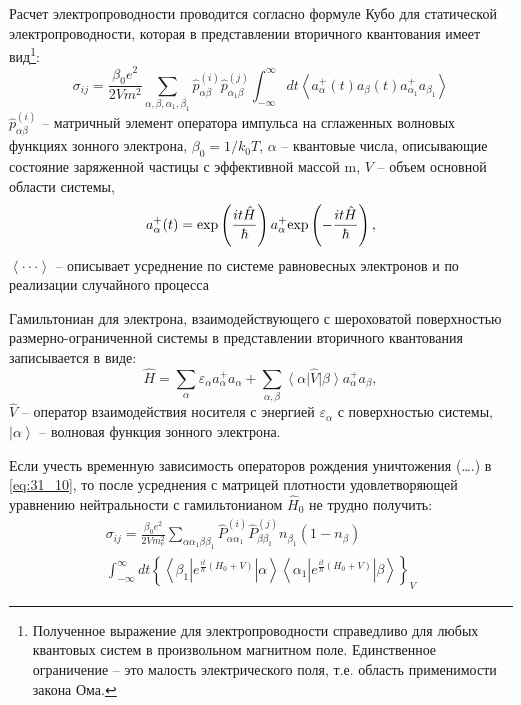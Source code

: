 Расчет электропроводности проводится согласно формуле Кубо \cite{Kubo1957a} для статической электропроводности, которая в представлении вторичного квантования имеет вид\footnote{ Полученное выражение для электропроводности справедливо для любых квантовых систем в произвольном магнитном поле. Единственное ограничение -- это малость электрического поля, т.е. область применимости закона Ома.}:
\begin{equation} \label{eq:31_10}
\sigma _{ij} =\frac{\beta _{0} e^{2} }{2Vm^{2} } \sum _{\alpha ,\beta ,\alpha _{1} ,\beta _{1} }\hat{p}_{\alpha \beta }^{(i)} \hat{p}_{\alpha _{1} \beta }^{(j)} \int _{-\infty }^{\infty }dt\left\langle a_{\alpha }^{+} (t)a_{\beta } (t)a_{\alpha _{1} }^{+} a_{\beta _{1} } \right\rangle
\end{equation} 
$\hat{p}_{\alpha \beta }^{(i)} $ -- матричный элемент оператора импульса на сглаженных волновых функциях зонного электрона, $\beta _{0} =1/k_{0} T$, $\alpha $ -- квантовые числа, описывающие состояние заряженной частицы с эффективной массой m, $V$ -- объем основной области системы,
\[
a_{\alpha }^{+} (t)={\rm exp}\left(\frac{it\hat{H}}{\hbar } \right)a_{\alpha }^{+} {\rm exp}\left(-\frac{it\hat{H}}{\hbar } \right),
\] 
$\left\langle \cdot \cdot \cdot \right\rangle $ -- описывает усреднение по системе равновесных электронов и по реализации случайного процесса

Гамильтониан для электрона, взаимодействующего с шероховатой поверхностью размерно-ограниченной системы в представлении вторичного квантования записывается в виде:
\begin{equation} \label{eq:31_20}
\hat{H}=\sum _{\alpha }\varepsilon _{\alpha } a_{\alpha }^{+} a_{\alpha } +\sum _{\alpha ,\beta }{\left\langle \alpha  \right|} \hat{V}{\left| \beta  \right\rangle} a_{\alpha }^{+} a_{\beta }, 
\end{equation}
$\hat{V}$ -- оператор взаимодействия носителя с энергией $\varepsilon _{\alpha } $ с поверхностью системы, ${\left| \alpha  \right\rangle} $ -- волновая функция зонного электрона.

Если учесть временную зависимость операторов рождения уничтожения (\dots .) в \eqref{eq:31_10}, то после усреднения с матрицей плотности удовлетворяющей уравнению нейтральности с гамильтонианом ${\hat{H}}_0$ не трудно получить:
\begin{multline} \label{eq:31_30}
{\sigma }_{ij}=\frac{{\beta }_0 e^2}{2Vm^2_e}\sum_{\alpha \alpha _1\beta \beta_1}{{\hat{P}}^{\left(i\right)}_{\alpha {\alpha }_1}{\hat{P}}^{\left(j\right)}_{\beta {\beta }_1}n_{{\beta }_1}\left(1-n_{\beta }\right)}\\
\int^{\infty }_{-\infty }{d t {\left\{\left\langle {\beta }_1\left|e^{\frac{it}{\hbar }\left(H_0+V\right)}\right|\alpha \right\rangle \left\langle {\alpha }_1\left|e^{\frac{i t}{\hbar }\left(H_0+V\right)}\right|\beta \right\rangle \right\}}_V}
\end{multline}

